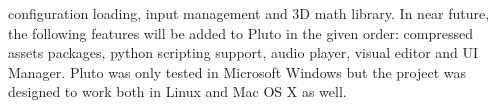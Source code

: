 configuration loading, input management and 3D math library. In near future, the following features will be added to Pluto in the given order: compressed assets packages, python scripting support, audio player, visual editor and UI Manager. Pluto was only tested in Microsoft Windows but the project was designed to work both in Linux and Mac OS X as well.